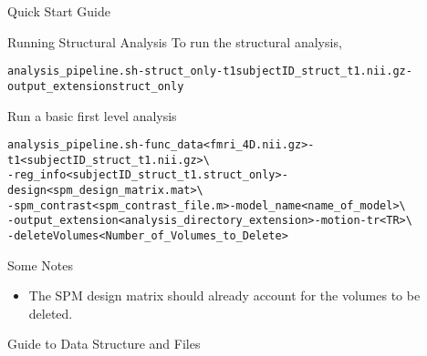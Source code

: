 \documentclass[]{report}
\begin{document}
\begin{chapter}{Quick Start Guide }
\begin{section}{Running Structural Analysis}
To run the structural analysis, 
\begin{alltt}
analysis_pipeline.sh -struct_only -t1 subjectID\_struct\_t1.nii.gz  -output\_extension struct\_only
\end{alltt}



\end{section}

\begin{section}{Run a basic first level analysis}
\
\begin{alltt}
analysis\_pipeline.sh  -func\_data <fmri\_4D.nii.gz>   -t1 <subjectID\_struct\_t1.nii.gz>  \textbackslash \\
\hspace*{0.5in} -reg\_info <subjectID\_struct\_t1.struct\_only> -design <spm\_design\_matrix.mat> \textbackslash  \\
\hspace*{0.5in} -spm\_contrast  <spm\_contrast\_file.m> -model\_name <name\_of\_model> \textbackslash   \\
\hspace*{0.5in} -output\_extension <analysis\_directory\_extension>  -motion -tr <TR> \textbackslash  \\
\hspace*{0.5in} -deleteVolumes <Number\_of\_Volumes\_to\_Delete>
\end{alltt}
{Some Notes}
\begin{itemize}
	\item  The SPM design matrix should already account for the volumes to be deleted.
\end{itemize}

\end{section}

\end{chapter}

\begin{chapter}{Guide to Data Structure and Files}

\end{chapter}
\end{document}
